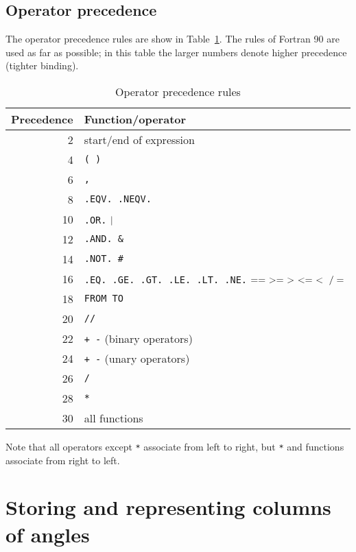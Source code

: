 \documentclass[twoside,11pt]{article}
\newcommand{\xlabel}[1]{}
\renewcommand{\_}{\texttt{\symbol{95}}}
\begin{document}
\subsection{Operator precedence}

The operator precedence rules are show in Table~\ref{PREC}. The rules
of Fortran 90 are used as far as possible; in this table the larger
numbers denote higher precedence (tighter binding).

\begin{table}[htbp]

\begin{center}
\begin{tabular}{rl}
Precedence  & Function/operator  \\ \hline
  2 & start/end of expression  \\
  4 & {\tt (  )}  \\
  6 & {\tt ,}  \\
  8 & {\tt .EQV.  .NEQV.}  \\
 10 & {\tt  .OR.}   ${\tt |}$  \\
 12 & {\tt .AND.  \&} \\
 14 & {\tt .NOT.  \#}  \\
 16 & {\tt .EQ. .GE. .GT. .LE. .LT. .NE.} ${\tt == ~ >= ~ > ~ <= ~ < ~ /=}$ \\
 18 & {\tt FROM  TO}  \\
 20 & {\tt  //}  \\
 22 & {\tt  + -} (binary operators)  \\
 24 & {\tt  + -} (unary operators)  \\
 26 & {\tt  * /}  \\
 28 & {\tt  **}  \\
 30 & all functions  \\
\end{tabular}
\end{center}

\caption{Operator precedence rules\label{PREC} }

\end{table}

Note that all operators except {\tt **} associate from left to right, but
{\tt **} and functions associate from right to left.


\section{\xlabel{ANGLE}\label{ANGLE}Storing and representing columns of angles}
\end{document}
